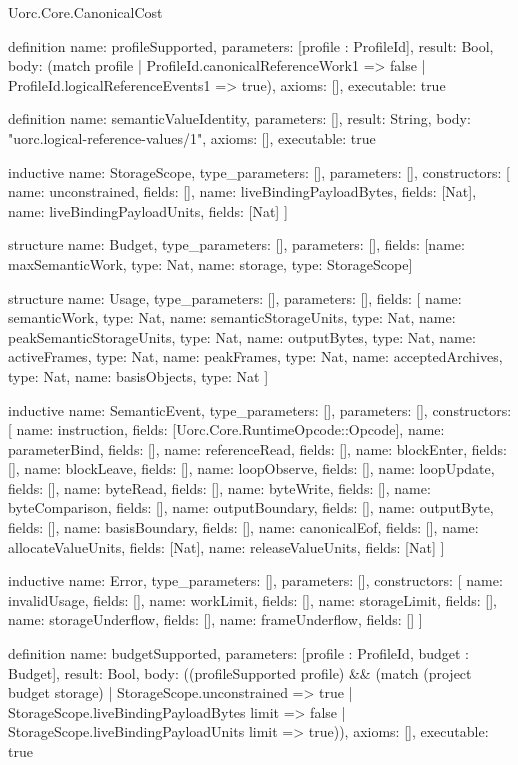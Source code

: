 \begin{lexlean}{Uorc.Core.CanonicalCost}
\begin{semanticmodule}
definition{
  name: profileSupported,
  parameters: [profile : ProfileId],
  result: Bool,
  body: (match profile
    | ProfileId.canonicalReferenceWork1 => false
    | ProfileId.logicalReferenceEvents1 => true),
  axioms: [],
  executable: true
}

definition{
  name: semanticValueIdentity,
  parameters: [],
  result: String,
  body: "uorc.logical-reference-values/1",
  axioms: [],
  executable: true
}

inductive{
  name: StorageScope,
  type_parameters: [],
  parameters: [],
  constructors: [
    {name: unconstrained, fields: []},
    {name: liveBindingPayloadBytes, fields: [Nat]},
    {name: liveBindingPayloadUnits, fields: [Nat]}
  ]
}

structure{
  name: Budget,
  type_parameters: [],
  parameters: [],
  fields: [{name: maxSemanticWork, type: Nat}, {name: storage, type: StorageScope}]
}

structure{
  name: Usage,
  type_parameters: [],
  parameters: [],
  fields: [
    {name: semanticWork, type: Nat},
    {name: semanticStorageUnits, type: Nat},
    {name: peakSemanticStorageUnits, type: Nat},
    {name: outputBytes, type: Nat},
    {name: activeFrames, type: Nat},
    {name: peakFrames, type: Nat},
    {name: acceptedArchives, type: Nat},
    {name: basisObjects, type: Nat}
  ]
}

inductive{
  name: SemanticEvent,
  type_parameters: [],
  parameters: [],
  constructors: [
    {name: instruction, fields: [Uorc.Core.RuntimeOpcode::Opcode]},
    {name: parameterBind, fields: []},
    {name: referenceRead, fields: []},
    {name: blockEnter, fields: []},
    {name: blockLeave, fields: []},
    {name: loopObserve, fields: []},
    {name: loopUpdate, fields: []},
    {name: byteRead, fields: []},
    {name: byteWrite, fields: []},
    {name: byteComparison, fields: []},
    {name: outputBoundary, fields: []},
    {name: outputByte, fields: []},
    {name: basisBoundary, fields: []},
    {name: canonicalEof, fields: []},
    {name: allocateValueUnits, fields: [Nat]},
    {name: releaseValueUnits, fields: [Nat]}
  ]
}

inductive{
  name: Error,
  type_parameters: [],
  parameters: [],
  constructors: [
    {name: invalidUsage, fields: []},
    {name: workLimit, fields: []},
    {name: storageLimit, fields: []},
    {name: storageUnderflow, fields: []},
    {name: frameUnderflow, fields: []}
  ]
}

definition{
  name: budgetSupported,
  parameters: [profile : ProfileId, budget : Budget],
  result: Bool,
  body: ((profileSupported profile) && (match (project budget storage)
    | StorageScope.unconstrained => true
    | StorageScope.liveBindingPayloadBytes limit => false
    | StorageScope.liveBindingPayloadUnits limit => true)),
  axioms: [],
  executable: true
}


\end{semanticmodule}
\end{lexlean}
